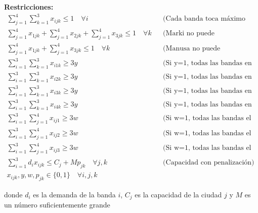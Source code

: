 \documentclass[12pt]{article}
\begin{document}
\textbf{Restricciones:}
\begin{align*}
    \sum_{j=1}^{4} \sum_{k=1}^{3} x_{ijk} \leq 1 \quad \forall i && \text{(Cada banda toca máximo una vez)} \\
    \sum_{j=1}^{4} x_{1jk} + \sum_{j=1}^{4} x_{2jk} + \sum_{j=1}^{4} x_{3jk} \leq 1 \quad \forall k && \text{(Marki no puede teletransportarse)} \\
    \sum_{j=1}^{4} x_{1jk} + \sum_{j=1}^{4} x_{3jk} \leq 1 \quad \forall k && \text{(Manusa no puede teletransportarse tampoco)} \\
    \sum_{i=1}^{3} \sum_{k=1}^{3} x_{i1k} \geq 3y && \text{(Si y=1, todas las bandas en Buenos Aires)} \\
    \sum_{i=1}^{3} \sum_{k=1}^{3} x_{i2k} \geq 3y && \text{(Si y=1, todas las bandas en Córdoba)} \\
    \sum_{i=1}^{3} \sum_{k=1}^{3} x_{i3k} \geq 3y && \text{(Si y=1, todas las bandas en Rosario)} \\
    \sum_{i=1}^{3} \sum_{k=1}^{3} x_{i4k} \geq 3y && \text{(Si y=1, todas las bandas en Mendoza)} \\
    \sum_{i=1}^{3} \sum_{j=1}^{4} x_{ij1} \geq 3w && \text{(Si w=1, todas las bandas el viernes)} \\
    \sum_{i=1}^{3} \sum_{j=1}^{4} x_{ij2} \geq 3w && \text{(Si w=1, todas las bandas el sábado)} \\
    \sum_{i=1}^{3} \sum_{j=1}^{4} x_{ij3} \geq 3w && \text{(Si w=1, todas las bandas el domingo)} \\
    \sum_{i=1}^{3} d_i x_{ijk} \leq C_j + M p_{jk} \quad \forall j,k && \text{(Capacidad con penalización)} \\
    x_{ijk}, y, w, p_{jk} \in \{0,1\} \quad \forall i,j,k
\end{align*}
\begin{center}
donde $d_i$ es la demanda de la banda $i$, $C_j$ es la capacidad de la ciudad $j$ y $M$ es un número suficientemente grande
\end{center}
\end{document}
